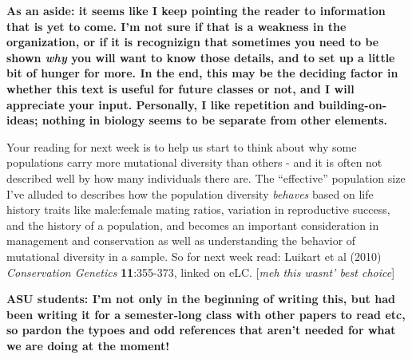 \documentclass[
]{article}
\begin{document}
\textbf{As an aside: it seems like I keep pointing the reader to
information that is yet to come. I'm not sure if that is a weakness in
the organization, or if it is recognizign that sometimes you need to be
shown \emph{why} you will want to know those details, and to set up a
little bit of hunger for more. In the end, this may be the deciding
factor in whether this text is useful for future classes or not, and I
will appreciate your input. Personally, I like repetition and
building-on-ideas; nothing in biology seems to be separate from other
elements.}

Your reading for next week is to help us start to think about why some
populations carry more mutational diversity than others - and it is
often not described well by how many individuals there are. The
``effective'' population size I've alluded to describes how the
population diversity \emph{behaves} based on life history traits like
male:female mating ratios, variation in reproductive success, and the
history of a population, and becomes an important consideration in
management and conservation as well as understanding the behavior of
mutational diversity in a sample. So for next week read: Luikart et al
(2010) \emph{Conservation Genetics} \textbf{11}:355-373, linked on eLC.
{[}\emph{meh this wasnt' best choice}{]}

\textbf{ASU students: I'm not only in the beginning of writing this, but
had been writing it for a semester-long class with other papers to read
etc, so pardon the typoes and odd references that aren't needed for what
we are doing at the moment!}
\end{document}
